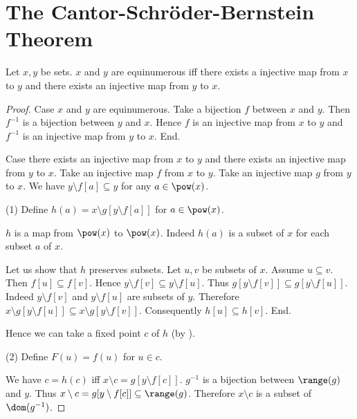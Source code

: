 \documentclass{article}
\begin{document}
  \section*{The Cantor-Schröder-Bernstein Theorem}

  \begin{forthel}
    \begin{theorem*}[title=Cantor-Schröder-Bernstein,id=cantor_schroeder_bernstein]
      Let $x,y$ be sets.
      $x$ and $y$ are equinumerous iff there exists a injective map from $x$ to $y$ and there exists an injective map from $y$ to $x$.
    \end{theorem*}
    \begin{proof}
      Case $x$ and $y$ are equinumerous.
        Take a bijection $f$ between $x$ and $y$.
        Then $f^{-1}$ is a bijection between $y$ and $x$.
        Hence $f$ is an injective map from $x$ to $y$ and $f^{-1}$ is an
        injective map from $y$ to $x$.
      End.

      Case there exists an injective map from $x$ to $y$ and there exists an injective map from $y$ to $x$.
        Take an injective map $f$ from $x$ to $y$.
        Take an injective map $g$ from $y$ to $x$.
        We have $y \setminus f[a] \subseteq y$ for any $a \in \pow(x)$.

        (1) Define $h(a) = x \setminus g[y \setminus f[a]]$ for $a \in \pow(x)$.

        $h$ is a map from $\pow(x)$ to $\pow(x)$.
        Indeed $h(a)$ is a subset of $x$ for each subset $a$ of $x$.

        Let us show that $h$ preserves subsets.
          Let $u, v$ be subsets of $x$.
          Assume $u \subseteq v$.
          Then $f[u] \subseteq f[v]$.
          Hence $y \setminus f[v] \subseteq y \setminus f[u]$.
          Thus $g[y \setminus f[v]] \subseteq g[y \setminus f[u]]$.
          Indeed $y \setminus f[v]$ and $y \setminus f[u]$ are subsets of $y$.
          Therefore $x \setminus g[y \setminus f[u]] \subseteq x \setminus g[y \setminus f[v]]$.
          Consequently $h[u] \subseteq h[v]$.
        End.

        Hence we can take a fixed point $c$ of $h$ (by ).

        (2) Define $F(u) = f(u)$ for $u \in c$.

        We have $c = h(c)$ iff $x \setminus c = g[y \setminus f[c]]$.
        $g^{-1}$ is a bijection between $\range(g)$ and $y$.
        Thus $x \setminus c = g[y \setminus f[c]] \subseteq \range(g)$.
        Therefore $x \setminus c$ is a subset of $\dom(g^{-1})$.


\end{proof}
\end{forthel}
\end{document}
